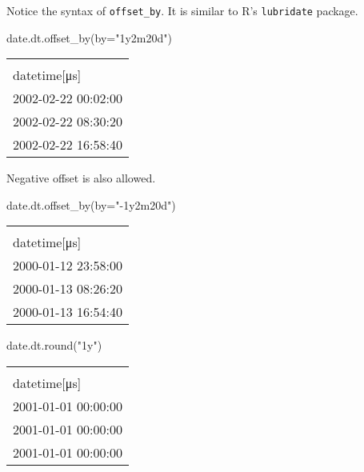 \documentclass[
  letterpaper,
  DIV=11,
  numbers=noendperiod]{scrartcl}
\newenvironment{Shaded}{\begin{snugshade}}{\end{snugshade}}
\newcommand{\BuiltInTok}[1]{\textcolor[rgb]{0.00,0.23,0.31}{#1}}
\newcommand{\NormalTok}[1]{\textcolor[rgb]{0.00,0.23,0.31}{#1}}
\newcommand{\OperatorTok}[1]{\textcolor[rgb]{0.37,0.37,0.37}{#1}}
\newcommand{\StringTok}[1]{\textcolor[rgb]{0.13,0.47,0.30}{#1}}
\begin{document}
Notice the syntax of \texttt{offset\_by}. It is similar to R's
\texttt{lubridate} package.

\begin{Shaded}
\begin{Highlighting}[]
\NormalTok{date.dt.offset\_by(by}\OperatorTok{=}\StringTok{"1y2m20d"}\NormalTok{)}
\end{Highlighting}
\end{Shaded}

\begin{longtable}[]{@{}l@{}}
\toprule()
 \\
datetime{[}μs{]} \\
\midrule()
\endhead
2002-02-22 00:02:00 \\
2002-02-22 08:30:20 \\
2002-02-22 16:58:40 \\
\bottomrule()
\end{longtable}

Negative offset is also allowed.

\begin{Shaded}
\begin{Highlighting}[]
\NormalTok{date.dt.offset\_by(by}\OperatorTok{=}\StringTok{"{-}1y2m20d"}\NormalTok{)}
\end{Highlighting}
\end{Shaded}

\begin{longtable}[]{@{}l@{}}
\toprule()
 \\
datetime{[}μs{]} \\
\midrule()
\endhead
2000-01-12 23:58:00 \\
2000-01-13 08:26:20 \\
2000-01-13 16:54:40 \\
\bottomrule()
\end{longtable}

\begin{Shaded}
\begin{Highlighting}[]
\NormalTok{date.dt.}\BuiltInTok{round}\NormalTok{(}\StringTok{"1y"}\NormalTok{)}
\end{Highlighting}
\end{Shaded}

\begin{longtable}[]{@{}l@{}}
\toprule()
 \\
datetime{[}μs{]} \\
\midrule()
\endhead
2001-01-01 00:00:00 \\
2001-01-01 00:00:00 \\
2001-01-01 00:00:00 \\
\bottomrule()
\end{longtable}
\end{document}

